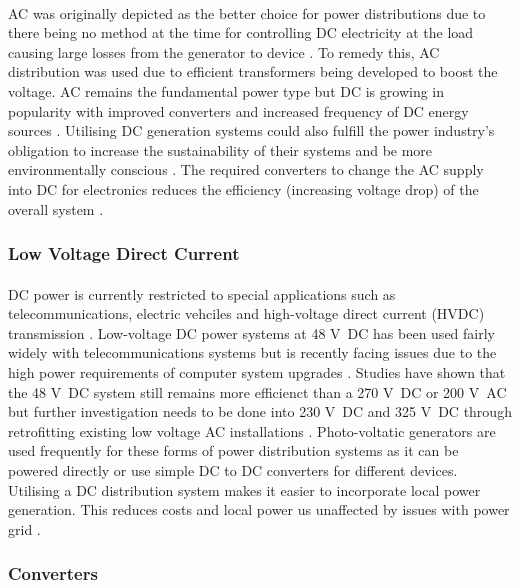 \paragraph{}
AC was originally depicted as the better choice for power distributions due to there
being no method at the time for controlling DC electricity at the load causing large
losses from the generator to device \cite{Starke2008b}. To remedy this, AC distribution was used
due to efficient transformers being developed to boost the voltage. AC remains the
fundamental power type but DC is growing in popularity with improved converters and
increased frequency of DC energy sources \cite{Starke2008b}. Utilising DC generation systems could
also fulfill the power industry's obligation to increase the sustainability of their systems
and be more environmentally conscious \cite{Starke2008a}. The required converters to change the AC
supply into DC for electronics reduces the efficiency (increasing voltage drop) of the
overall system \cite{Starke2008b}.    

\subsubsection{Low Voltage Direct Current}

\paragraph{}
DC power is currently restricted to special applications such as telecommunications, electric vehciles and high-voltage direct current (HVDC) transmission \cite{Salomonsson2007}. Low-voltage DC power systems at 48 \si{V DC} has been used fairly widely with telecommunications systems but is recently facing issues due to the high power requirements of computer system upgrades \cite{Salomonsson2007}. Studies have shown that the 48 \si{V DC} system still remains more efficienct than a 270 \si{V DC} or 200 \si{V AC} but further investigation needs to be done into 230 \si{V DC} and 325 \si{V DC} through retrofitting existing low voltage AC installations \cite{Salomonsson2007}. Photo-voltatic generators are used frequently for these forms of power distribution systems as it can be powered directly or use simple DC to DC converters for different devices. Utilising a DC distribution system makes it easier to incorporate local power generation. This reduces costs and local power us unaffected by issues with power grid \cite{Starke2008a}. 

\subsubsection{Converters}

